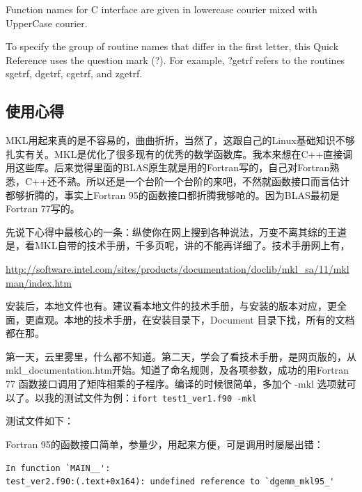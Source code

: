 Function names for C interface are given in lowercase courier mixed with UpperCase courier.

To specify the group of routine names that differ in the first letter, this Quick Reference uses the question mark (?). For example, ?getrf refers to the routines sgetrf, dgetrf, cgetrf, and zgetrf.


\subsection{使用心得}
MKL用起来真的是不容易的，曲曲折折，当然了，这跟自己的Linux基础知识不够扎实有关。MKL是优化了很多现有的优秀的数学函数库。我本来想在C++直接调用这些库。后来觉得里面的BLAS原生就是用的Fortran写的，自己对Fortran熟悉，C++还不熟。所以还是一个台阶一个台阶的来吧，不然就函数接口而言估计都够折腾的，事实上Fortran 95的函数接口都折腾我够呛的。因为BLAS最初是Fortran 77写的。

先说下心得中最核心的一条：纵使你在网上搜到各种说法，万变不离其综的王道是，看MKL自带的技术手册，千多页呢，讲的不能再详细了。技术手册网上有，

\url{http://software.intel.com/sites/products/documentation/doclib/mkl_sa/11/mklman/index.htm}

安装后，本地文件也有。建议看本地文件的技术手册，与安装的版本对应，更全面，更直观。本地的技术手册，在安装目录下，Document 目录下找，所有的文档都在那。

第一天，云里雾里，什么都不知道。第二天，学会了看技术手册，是网页版的，从mkl\_documentation.htm开始。知道了命名规则，及各项参数，成功的用Fortran 77 函数接口调用了矩阵相乘的子程序。编译的时候很简单，多加个 -mkl 选项就可以了。以我的测试文件为例：\verb|ifort test1_ver1.f90 -mkl|

测试文件如下：


Fortran 95的函数接口简单，参量少，用起来方便，可是调用时屡屡出错：
\begin{verbatim}
In function `MAIN__':
test_ver2.f90:(.text+0x164): undefined reference to `dgemm_mkl95_'
\end{verbatim}

